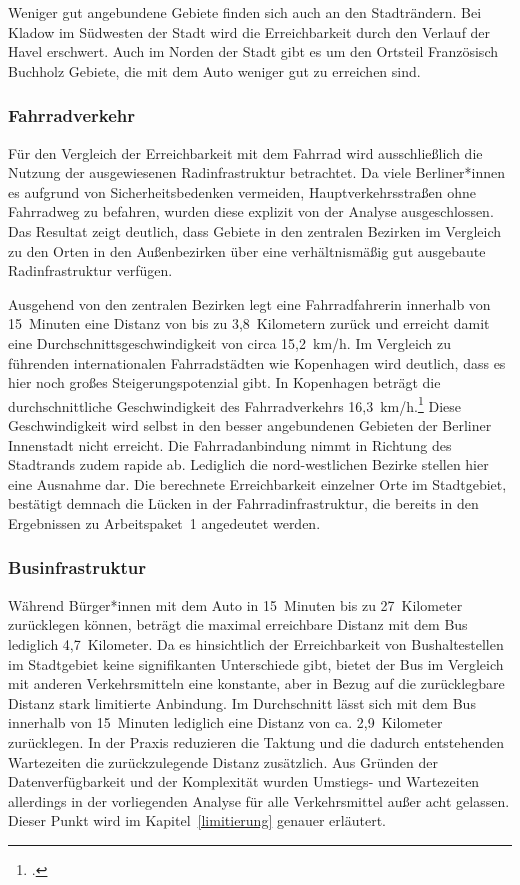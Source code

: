 Weniger gut angebundene Gebiete finden sich auch an den Stadträndern. Bei Kladow im Südwesten der Stadt wird die Erreichbarkeit durch den Verlauf der Havel erschwert. Auch im Norden der Stadt gibt es um den Ortsteil Französisch Buchholz Gebiete, die mit dem Auto weniger gut zu erreichen sind.

\subsubsection{Fahrradverkehr}

Für den Vergleich der Erreichbarkeit mit dem Fahrrad wird ausschließlich die Nutzung der ausgewiesenen Radinfrastruktur betrachtet. Da viele Berliner*innen es aufgrund von Sicherheitsbedenken vermeiden, Hauptverkehrsstraßen ohne Fahrradweg zu befahren, wurden diese explizit von der Analyse ausgeschlossen. Das Resultat zeigt deutlich, dass Gebiete in den zentralen Bezirken im Vergleich zu den Orten in den Außenbezirken über eine verhältnismäßig gut ausgebaute Radinfrastruktur verfügen.


Ausgehend von den zentralen Bezirken legt eine Fahrradfahrerin innerhalb von 15~Minuten eine Distanz von bis zu 3,8~Kilometern zurück und erreicht damit eine Durchschnittsgeschwindigkeit von circa 15,2~km/h. Im Vergleich zu führenden internationalen Fahrradstädten wie Kopenhagen wird deutlich, dass es hier noch großes Steigerungspotenzial gibt. In Kopenhagen beträgt die durchschnittliche Geschwindigkeit des Fahrradverkehrs 16,3~km/h.\footcite{kopenhagen}
Diese Geschwindigkeit wird selbst in den besser angebundenen Gebieten der Berliner Innenstadt nicht erreicht. Die Fahrradanbindung nimmt in Richtung des Stadtrands zudem rapide ab. Lediglich die nord-westlichen Bezirke stellen hier eine Ausnahme dar. Die berechnete Erreichbarkeit einzelner Orte im Stadtgebiet, bestätigt demnach die Lücken in der Fahrradinfrastruktur, die bereits in den Ergebnissen zu Arbeitspaket~1 angedeutet werden.

\subsubsection{Businfrastruktur}

Während Bürger*innen mit dem Auto in 15~Minuten bis zu 27~Kilometer zurücklegen können, beträgt die maximal erreichbare Distanz mit dem Bus lediglich 4,7~Kilometer. Da es hinsichtlich der Erreichbarkeit von Bushaltestellen im Stadtgebiet keine signifikanten Unterschiede gibt, bietet der Bus im Vergleich mit anderen Verkehrsmitteln eine konstante, aber in Bezug auf die zurücklegbare Distanz stark limitierte Anbindung. Im Durchschnitt lässt sich mit dem Bus innerhalb von 15~Minuten lediglich eine Distanz von ca. 2,9~Kilometer zurücklegen. In der Praxis reduzieren die Taktung und die dadurch entstehenden Wartezeiten die zurückzulegende Distanz zusätzlich. Aus Gründen der Datenverfügbarkeit und der Komplexität wurden  Umstiegs- und Wartezeiten allerdings in der vorliegenden Analyse für alle Verkehrsmittel außer acht gelassen. Dieser Punkt wird im Kapitel~\ref{limitierung} genauer erläutert.

